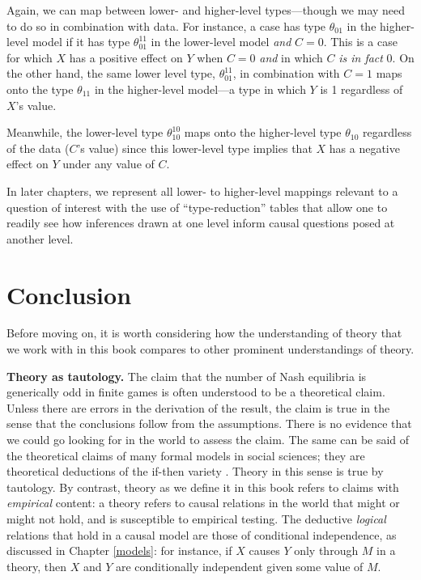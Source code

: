 \documentclass[12pt,]{book}
\begin{document}
Again, we can map between lower- and higher-level types---though we may need to do so in combination with data. For instance, a case has type \(\theta_{01}\) in the higher-level model if it has type \(\theta_{01}^{11}\) in the lower-level model \emph{and} \(C=0\). This is a case for which \(X\) has a positive effect on \(Y\) when \(C=0\) \emph{and} in which \(C\) \emph{is in fact} 0. On the other hand, the same lower level type, \(\theta_{01}^{11}\), in combination with \(C=1\) maps onto the type \(\theta_{11}\) in the higher-level model---a type in which \(Y\) is 1 regardless of \(X\)'s value.

Meanwhile, the lower-level type \(\theta_{10}^{10}\) maps onto the higher-level type \(\theta_{10}\) regardless of the data (\(C\)'s value) since this lower-level type implies that \(X\) has a negative effect on \(Y\) under any value of \(C\).

In later chapters, we represent all lower- to higher-level mappings relevant to a question of interest with the use of ``type-reduction'' tables that allow one to readily see how inferences drawn at one level inform causal questions posed at another level.

\hypertarget{conclusion}{%
\section{Conclusion}\label{conclusion}}

Before moving on, it is worth considering how the understanding of theory that we work with in this book compares to other prominent understandings of theory.

\textbf{Theory as tautology.} The claim that the number of Nash equilibria is generically odd in finite games is often understood to be a theoretical claim. Unless there are errors in the derivation of the result, the claim is true in the sense that the conclusions follow from the assumptions. There is no evidence that we could go looking for in the world to assess the claim. The same can be said of the theoretical claims of many formal models in social sciences; they are theoretical deductions of the if-then variety \citep{clarke2012model}. Theory in this sense is true by tautology. By contrast, theory as we define it in this book refers to claims with \emph{empirical} content: a theory refers to causal relations in the world that might or might not hold, and is susceptible to empirical testing. The deductive \emph{logical} relations that hold in a causal model are those of conditional independence, as discussed in Chapter \ref{models}: for instance, if \(X\) causes \(Y\) only through \(M\) in a theory, then \(X\) and \(Y\) are conditionally independent given some value of \(M\).
\end{document}
